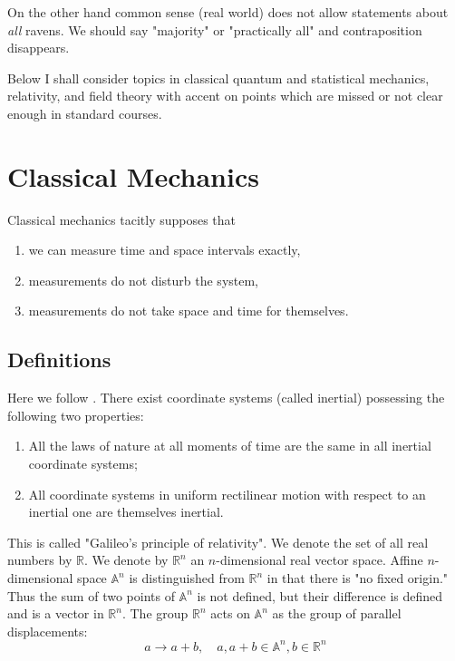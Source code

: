 \documentclass[11pt]{book}
\begin{document}
On the other hand common sense (real world) does not allow statements about {\em all} ravens. We should say "majority" or "practically all" and  contraposition  disappears.

Below I shall consider topics in classical quantum and statistical mechanics, relativity, and field theory with accent on points which are missed or not clear enough in standard courses.

\chapter{Classical Mechanics}
\label{class-mech}
Classical mechanics tacitly supposes that
\begin{enumerate}
    \item we can measure time and space intervals exactly,
    \item measurements do not disturb the system,
    \item measurements do not take space and time for themselves.
\end{enumerate}

\section{Definitions}
\label{class-mech-def}

Here we follow  \cite{arnold-cm-r}.%
There exist coordinate systems (called inertial) possessing the following two properties:
\begin{enumerate}
    \item All the laws of nature at all moments of time are the same in all inertial coordinate systems;
    \item  All coordinate systems in uniform rectilinear motion with respect to an inertial one are themselves inertial.
\end{enumerate}
This is called "Galileo's principle of relativity".
We denote the set of all real numbers by $\mathbb{R}$. We denote by $\mathbb{R}^n$ an $n$-dimensional 
real vector space. Affine $n$-dimensional space $\mathbb{A}^n$ is distinguished 
from $\mathbb{R}^n$ in that there is "no fixed origin." Thus the sum of two points
of $\mathbb{A}^n$ is not defined, but their difference is defined and is a vector in $\mathbb{R}^n$.
The group $\mathbb{R}^n$ acts on $\mathbb{A}^n$ as the group of parallel displacements: 
\[a \rightarrow a+b,\quad a,a+b \in \mathbb{A}^n,b\in\mathbb{R}^n\]
\end{document}
